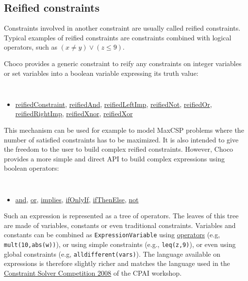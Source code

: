 \subsection{Reified constraints}\label{model:reifiedconstraints}\hypertarget{model:reifiedconstraints}{}
Constraints involved in another constraint are usually called reified constraints. Typical examples of reified constraints are
 constraints combined with logical operators, such as $(x \neq y) \lor (z \le 9)$.

Choco provides a generic constraint to reify any constraints on integer variables or set variables into a boolean variable expressing its truth value:
\begin{notedef}\tt
  \begin{itemize}
  \item \hyperlink{reifiedconstraint:reifiedconstraintconstraint}{reifiedConstraint}, \hyperlink{reifiedand:reifiedandconstraint}{reifiedAnd}, \hyperlink{reifiedleftimp:reifiedleftimpconstraint}{reifiedLeftImp}, \hyperlink{reifiednot:reifiednotconstraint}{reifiedNot}, \hyperlink{reifiedor:reifiedorconstraint}{reifiedOr}, \hyperlink{reifiedrightimp:reifiedrightimpconstraint}{reifiedRightImp}, \hyperlink{reifiedxnor:reifiedxnorconstraint}{reifiedXnor}, \hyperlink{reifiedxor:reifiedxorconstraint}{reifiedXor}
  \end{itemize}
\end{notedef}
This mechanism can be used for example to model MaxCSP problems where the number of satisfied constraints has to be maximized.
It is also intended to give the freedom to the user to build complex reified constraints. However, Choco provides a more simple and direct API to build complex expressions using boolean operators:
\begin{notedef}\tt
  \begin{itemize}
  \item \hyperlink{and:andconstraint}{and}, \hyperlink{or:orconstraint}{or}, \hyperlink{implies:impliesconstraint}{implies}, \hyperlink{ifonlyif:ifonlyifconstraint}{ifOnlyIf}, \hyperlink{ifthenelse:ifthenelseconstraint}{ifThenElse}, \hyperlink{not:notconstraint}{not}
  \end{itemize}
\end{notedef}
Such an expression is represented as a tree of operators. The leaves of this tree are made of variables, constants or even traditional constraints. Variables and constants can be combined as \texttt{ExpressionVariable} using \hyperlink{model:expressionvariables}{operators} (e.g, \texttt{mult(10,abs(w))}), or using simple constraints (e.g., \texttt{leq(z,9)}), or even using global constraints (e.g, \texttt{alldifferent(vars)}).
The language available on expressions is therefore slightly richer and matches the language used in the \href{http://cpai.ucc.ie/08/}{Constraint Solver Competition 2008} of the CPAI workshop.

